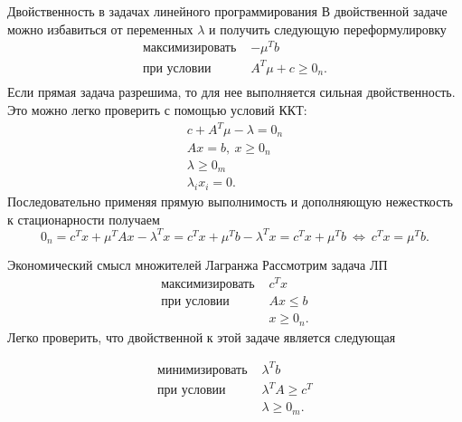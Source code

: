 \documentclass[10pt]{beamer}
\begin{document}
\begin{frame}{Двойственность в задачах линейного программирования}
В двойственной задаче можно избавиться от переменных $\lambda$ и получить следующую переформулировку
$$
\begin{array}{ll}
\mbox{максимизировать } & -\mu^Tb \\
\mbox{при условии }     & A^T\mu+c\geq 0_n. \\ 
\end{array}
$$
Если прямая задача разрешима, то для нее выполняется сильная двойственность. Это можно легко проверить с помощью условий ККТ:
\begin{align*}
c+A^T\mu-\lambda=0_n\\
Ax=b,~x\geq 0_n\\
\lambda\geq 0_m\\
\lambda_ix_i=0.
\end{align*}
Последовательно применяя прямую выполнимость и дополняющую нежесткость к стационарности получаем
$$
0_n=c^Tx+\mu^TAx-\lambda^Tx=c^Tx+\mu^Tb-\lambda^Tx=c^Tx+\mu^Tb~\Leftrightarrow~c^Tx=\mu^Tb.
$$

\end{frame}

\begin{frame}{Экономический смысл множителей Лагранжа}
Рассмотрим задача ЛП
$$
\begin{array}{ll}
\mbox{максимизировать } & c^Tx\\
\mbox{при условии }    & Ax\leq b\\
					   & x\geq 0_n.
\end{array}
$$
Легко проверить, что двойственной к этой задаче является следующая

$$
\begin{array}{ll}
\mbox{минимизировать } & \lambda^Tb\\
\mbox{при условии }    & \lambda^TA\geq c^T\\
					   & \lambda\geq 0_m.
\end{array}
$$
\end{frame}
\end{document}
